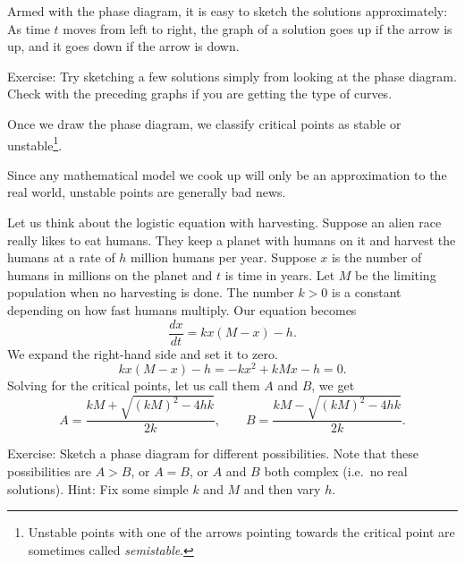 \begin{center}
\end{center}

\pagebreak[0]
Armed with the phase diagram,
it is easy to sketch the solutions approximately:  As time $t$
moves from left to right,
the graph of a solution
goes up if the arrow is up, and it goes down if the arrow is down.

Exercise: Try sketching a few solutions simply from looking at the phase diagram.
Check with the preceding graphs if
you are getting the type of curves.


\pagebreak[0]
Once we draw the phase diagram, we classify critical points
as stable or unstable\footnote{Unstable 
points with one of the
arrows pointing towards the critical point are sometimes called
\emph{semistable}.}.  

\begin{center}
\end{center}

Since any mathematical model we cook up will only be an approximation
to the real world, unstable points are generally bad news.

\medskip

Let us think about the logistic equation
with harvesting.
Suppose an alien race really likes to
eat humans.  They keep a planet with humans on it and harvest the
humans at a rate of $h$ million humans per
year.  Suppose $x$
is the number of humans in millions on the planet and $t$ is time in years.
Let $M$ be the limiting
population when no harvesting is done.  The number $k > 0$ is a
constant depending
on how fast humans multiply.  Our equation becomes
\begin{equation*}
\frac{dx}{dt} = kx(M-x) - h .
\end{equation*}
We expand the right-hand side and set it to zero.
\begin{equation*}
kx(M-x) - h = -kx^2+kMx - h  = 0.
\end{equation*}
Solving for
the critical points,
let us call them $A$ and $B$, we get
\begin{equation*}
A = \frac{kM + \sqrt{{(kM)}^2 - 4hk}}{2k}, \qquad
B = \frac{kM - \sqrt{{(kM)}^2 - 4hk}}{2k} .
\end{equation*}

Exercise: Sketch a phase diagram for different possibilities.  Note
that these possibilities are $A > B$, or $A=B$, or $A$ and $B$ both complex
(i.e.\ no real solutions).  Hint: Fix some simple $k$ and $M$ and then vary
$h$.


